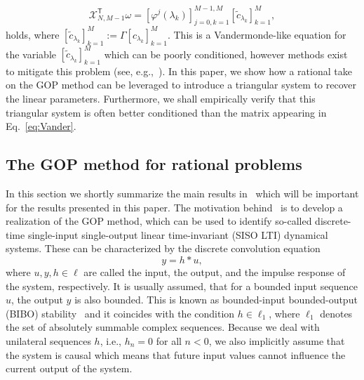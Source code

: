 \documentclass{arxiv}
\newcommand{\T}{\mathsf{T}}
\renewcommand{\tilde}{\widetilde}
\begin{document}
\begin{equation}
    \label{eq:Vander}
    \mathcal{X}_{N, M-1}^{\T} \omega = \left[ \varphi^j(\lambda_k) \right]_{j=0, k=1}^{M-1, M}  {[\tilde{c}_{\lambda_k}]}_{k=1}^M,
\end{equation}
holds, where ${[\tilde{c}_{\lambda_k}]}_{k=1}^M := \Gamma {[c_{\lambda_k}]}_{k=1}^M$. This is a Vandermonde-like equation for the variable ${[\tilde{c}_{\lambda_k}]}_{k=1}^M$ which can be poorly conditioned, however methods exist to mitigate this problem (see, e.g.,~\cite{higham1988fast}). In this paper, we show how a rational take on the GOP method can be leveraged to introduce a triangular system to recover the linear parameters. Furthermore, we shall empirically verify that this triangular system is often better conditioned than the matrix appearing in Eq.~\eqref{eq:Vander}.  

\subsection{The GOP method for rational problems}
\label{sec:pronyrat}

In this section we shortly summarize the main results in~\cite{dozsa2025system} which will be important for the results presented in this paper. The motivation behind~\cite{dozsa2025system} is to develop a realization of the GOP method, which can be used to identify so-called discrete-time single-input single-output linear time-invariant (SISO LTI) dynamical systems.
These can be characterized by the discrete convolution equation
\begin{equation}
    \label{eq:sisoTime}
    y = h \ast u,
\end{equation}
where $u, y, h \in \ell$ are called the input, the output, and the impulse response of the system, respectively. It is usually assumed, that for a bounded input sequence $u$, the output $y$ is also bounded. This is known as bounded-input bounded-output (BIBO) stability~\cite{szidar, vandenhof} and it coincides with the condition $h \in \ell_1$, where $\ell_1$ denotes the set of absolutely summable complex sequences. Because we deal with unilateral sequences $h$, i.e., $h_n = 0$ for all $n < 0$, we also implicitly assume that the system is causal which means that future input values cannot influence the current output of the system.
\end{document}
